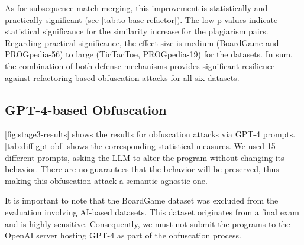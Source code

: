As for subsequence match merging, this improvement is statistically and practically significant (see \autoref{tab:to-base-refactor}).
The low p-values indicate statistical significance for the similarity increase for the plagiarism pairs.
Regarding practical significance, the effect size is medium (BoardGame and PROGpedia-56) to large (TicTacToe, PROGpedia-19) for the datasets.
In sum, the combination of both defense mechanisms provides significant resilience against refactoring-based obfuscation attacks for all six datasets.


\subsection{GPT-4-based Obfuscation}\label{sec:eval-gptobf}
\autoref{fig:stage3-results} shows the results for obfuscation attacks via GPT-4 prompts. 
\autoref{tab:diff-gpt-obf} shows the corresponding statistical measures.
We used 15 different prompts, asking the LLM to alter the program without changing its behavior. %
There are no guarantees that the behavior will be preserved, thus making this obfuscation attack a semantic-agnostic one.

It is important to note that the BoardGame dataset was excluded from the evaluation involving AI-based datasets. This dataset originates from a final exam and is highly sensitive. Consequently, we must not submit the programs to the OpenAI server hosting GPT-4 as part of the obfuscation process.

